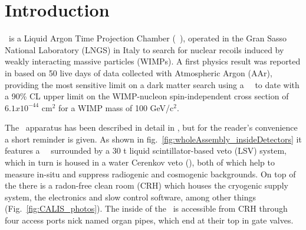 \section{Introduction}\label{sec:intro}\label{sec:introduction}

\dsf\ is a Liquid Argon Time Projection Chamber (\lar\ \tpc), operated in the Gran Sasso National Laboratory (LNGS) in Italy to search for nuclear recoils induced by weakly interacting massive particles (WIMPs). A first physics result was reported in \cite{Agnes:2015gu} based on 50 live days of data collected with Atmospheric Argon (AAr), providing the most sensitive limit on a dark matter search using a \lar\ \tpc\ to date with a 90\% CL upper limit on the WIMP-nucleon spin-independent cross section of $6.1 x 10^{-44}$ cm$^2$ for a WIMP mass of 100 GeV/c$^2$.  %

The \dsf\ apparatus has been described in detail in \cite{Agnes:2015gu}, but for the reader's convenience a short reminder is given. As shown in fig.~\ref{fig:wholeAssembly_insideDetectors} it features a \lar\ \tpc\ surrounded by a 30 t liquid scintillator-based veto (LSV) system, which in turn is housed in a water Cerenkov veto (\wcv), both of which help to measure in-situ and suppress radiogenic and cosmogenic backgrounds. On top of the \wcv there is a radon-free clean room (CRH) which houses the cryogenic supply system, the electronics and slow control software, among other things (Fig.~\ref{fig:CALIS_photos}). The inside of the \lsv\ is accessible from CRH through four access ports nick named organ pipes, which end at their top in gate valves. 


